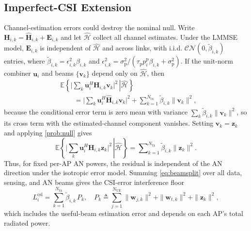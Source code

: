 \documentclass[letterpaper,journal]{IEEEtran}
\begin{document}
\subsection{Imperfect-CSI Extension}
\label{subsec:robust-formulation}
Channel-estimation errors could destroy the nominal null. Write $\mathbf{H}_{i,k}=\widehat{\mathbf{H}}_{i,k}+\mathbf{E}_{i,k}$ and let $\widehat{\mathcal H}$ collect all channel estimates. Under the LMMSE model, $\mathbf E_{i,k}$ is independent of $\widehat{\mathcal H}$ and across links, with i.i.d. $\mathcal{CN}(0,\widetilde\beta_{i,k})$ entries, where $\widetilde\beta_{i,k}=\epsilon_{i,k}^{2}\beta_{i,k}$ and $\epsilon_{i,k}^{2}=\sigma_{\mathrm{p}}^{2}/(\tau_{\mathrm{p}}p_i^{\mathrm{p}}\beta_{i,k}+\sigma_{\mathrm{p}}^{2})$. If the unit-norm combiner $\mathbf u_i$ and beams $\{\mathbf v_k\}$ depend only on $\widehat{\mathcal H}$, then
\begin{equation}
\begin{aligned}
&\mathbb{E}\!\left\{\left.\Big|{\textstyle\sum_k}\mathbf{u}_i^{H}\mathbf{H}_{i,k}\mathbf{v}_k\Big|^{2}\,\right|\widehat{\mathcal{H}}\right\}\\
&\qquad=\Big|{\textstyle\sum\nolimits_k}\mathbf{u}_i^{H}\widehat{\mathbf{H}}_{i,k}\mathbf{v}_k\Big|^{2}
+\sum\nolimits_{k=1}^{N_{\mathrm{tx}}}\widetilde{\beta}_{i,k}\|\mathbf{v}_k\|^{2},
\end{aligned}
\label{eq:beamsplit}
\end{equation}
because the conditional error term is zero mean with variance $\sum_k\widetilde\beta_{i,k}\|\mathbf v_k\|^2$, so its cross term with the estimated-channel component vanishes. Setting $\mathbf v_k=\mathbf z_k$ and applying \eqref{prob:null} gives
\begin{equation}
\mathbb{E}\!\left\{\left.\Big|{\textstyle\sum_k}\mathbf{u}_i^{H}\mathbf{H}_{i,k}\mathbf{z}_k\Big|^{2}\,\right|\widehat{\mathcal{H}}\right\}
=\sum\nolimits_{k=1}^{N_{\mathrm{tx}}}\widetilde{\beta}_{i,k}\|\mathbf{z}_k\|^{2}.
\label{eq:leakpower}
\end{equation}
Thus, for fixed per-AP AN powers, the residual is independent of the AN direction under the isotropic error model. Summing \eqref{eq:beamsplit} over all data, sensing, and AN beams gives the CSI-error interference floor
\begin{equation}
L_i^{\mathrm{csi}}=\sum_{k=1}^{N_{\mathrm{tx}}}\widetilde{\beta}_{i,k}\,P_k,
\quad
P_k\triangleq\sum_{j=1}^{N_{\mathrm{UE}}}\|\mathbf{w}_{j,k}\|^{2}
+\|\mathbf{w}_{t,k}\|^{2}+\|\mathbf{z}_k\|^{2},
\label{eq:csi-floor}
\end{equation}
which includes the useful-beam estimation error and depends on each AP's total radiated power.
\end{document}
